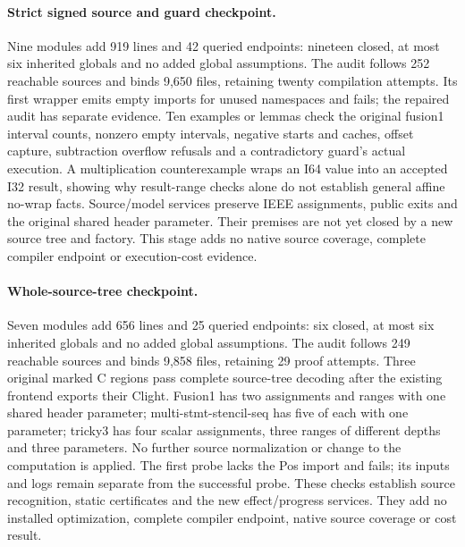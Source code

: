 \paragraph{Strict signed source and guard checkpoint.}
Nine modules add 919 lines and 42 queried endpoints: nineteen closed, at most
six inherited globals and no added global assumptions. The audit follows 252
reachable sources and binds 9,650 files, retaining twenty compilation attempts.
Its first wrapper emits empty imports for unused namespaces and fails; the
repaired audit has separate evidence. Ten examples or lemmas check the original
fusion1 interval counts, nonzero empty intervals, negative starts and caches,
offset capture, subtraction overflow refusals and a contradictory guard's
actual execution. A multiplication counterexample wraps an I64 value into an
accepted I32 result, showing why result-range checks alone do not establish
general affine no-wrap facts. Source/model services preserve IEEE assignments,
public exits and the original shared header parameter. Their premises are not
yet closed by a new source tree and factory. This stage adds no native source
coverage, complete compiler endpoint or execution-cost evidence.

\paragraph{Whole-source-tree checkpoint.}
Seven modules add 656 lines and 25 queried endpoints: six closed, at most six
inherited globals and no added global assumptions. The audit follows 249
reachable sources and binds 9,858 files, retaining 29 proof attempts. Three
original marked C regions pass complete source-tree decoding after the existing
frontend exports their Clight. Fusion1 has two assignments and ranges with one
shared header parameter; multi-stmt-stencil-seq has five of each with one
parameter; tricky3 has four scalar assignments, three ranges of different
depths and three parameters. No further source normalization or change to the
computation is applied. The first probe lacks the Pos import and fails; its
inputs and logs remain separate from the successful probe. These checks establish
source recognition, static certificates and the new effect/progress services.
They add no installed optimization, complete compiler endpoint, native source
coverage or cost result.

